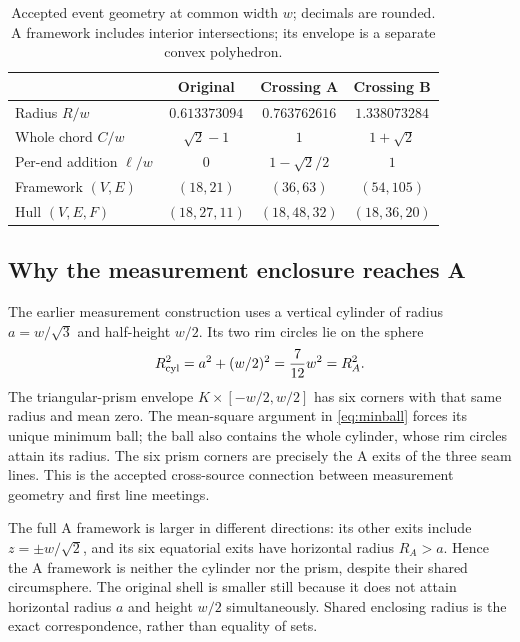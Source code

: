 \begin{table}[htbp]\centering\small
\caption{Accepted event geometry at common width $w$; decimals are rounded. A framework includes interior intersections; its envelope is a separate convex polyhedron.}\label{tab:events}
\begin{tabular}{@{}lccc@{}}\toprule
 & Original & Crossing A & Crossing B\\\midrule
Radius $R/w$ & $0.613373094$ & $0.763762616$ & $1.338073284$\\
Whole chord $C/w$ & $\sqrt2-1$ & $1$ & $1+\sqrt2$\\
Per-end addition $\ell/w$ & $0$ & $1-\sqrt2/2$ & $1$\\
Framework $(V,E)$ & $(18,21)$ & $(36,63)$ & $(54,105)$\\
Hull $(V,E,F)$ & $(18,27,11)$ & $(18,48,32)$ & $(18,36,20)$\\\bottomrule
\end{tabular}
\end{table}

\subsection{Why the measurement enclosure reaches A}
The earlier measurement construction uses a vertical cylinder of radius $a=w/\sqrt3$ and half-height $w/2$. Its two rim circles lie on the sphere
\begin{equation}\label{eq:cylinder}
R_{\rm cyl}^2=a^2+(w/2)^2=\frac7{12}w^2=R_A^2.
\end{equation}
The triangular-prism envelope $K\times[-w/2,w/2]$ has six corners with that same radius and mean zero. The mean-square argument in \eqref{eq:minball} forces its unique minimum ball; the ball also contains the whole cylinder, whose rim circles attain its radius. The six prism corners are precisely the A exits of the three seam lines. This is the accepted cross-source connection between measurement geometry and first line meetings.~\cite{TSZSphere,TSZReview}

The full A framework is larger in different directions: its other exits include $z=\pm w/\sqrt2$, and its six equatorial exits have horizontal radius $R_A>a$. Hence the A framework is neither the cylinder nor the prism, despite their shared circumsphere. The original shell is smaller still because it does not attain horizontal radius $a$ and height $w/2$ simultaneously. Shared enclosing radius is the exact correspondence, rather than equality of sets.

